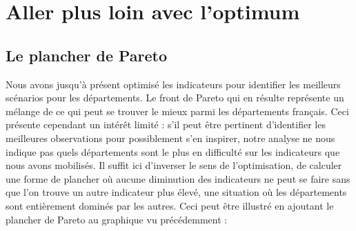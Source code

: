 \documentclass[
  french,
  11pt,
  a4paper,
]{article}
\begin{document}
\section{Aller plus loin avec
l'optimum}\label{aller-plus-loin-avec-loptimum}

\subsection{Le plancher de Pareto}\label{le-plancher-de-pareto}

Nous avons jusqu'à présent optimisé les indicateurs pour identifier les
meilleurs scénarios pour les départements. Le front de Pareto qui en
résulte représente un mélange de ce qui peut se trouver le mieux parmi
les départements français. Ceci présente cependant un intérêt limité :
s'il peut être pertinent d'identifier les meilleures observations pour
possiblement s'en inspirer, notre analyse ne nous indique pas quels
départements sont le plus en difficulté sur les indicateurs que nous
avons mobilisés. Il suffit ici d'inverser le sens de l'optimisation, de
calculer une forme de plancher où aucune diminution des indicateurs ne
peut se faire sans que l'on trouve un autre indicateur plus élevé, une
situation où les départements sont entièrement dominés par les autres.
Ceci peut être illustré en ajoutant le plancher de Pareto au graphique
vu précédemment :
\end{document}
